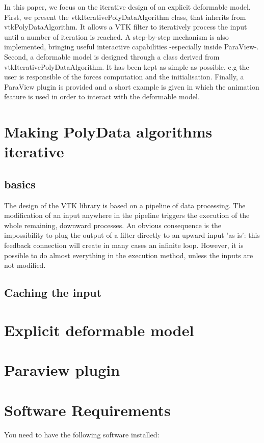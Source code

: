 \documentclass{InsightArticle}
\begin{document}
In this paper, we focus on the iterative design of an explicit deformable 
model. First, we present the vtkIterativePolyDataAlgorithm class, that 
inherits from vtkPolyDataAlgorithm. It allows a VTK filter to iteratively
process the input until a number of iteration is reached. A step-by-step
mechanism is also implemented, bringing useful interactive capabilities
-especially inside ParaView-. Second, a deformable model is designed through
a class derived from vtkIterativePolyDataAlgorithm. It has been kept as simple
as possible, e.g the user is responsible of the forces computation and the
initialisation. Finally, a ParaView plugin is provided and a short example 
is given in which the animation feature is used in order to interact with the 
deformable model.
%
\section{Making PolyData algorithms iterative}
\subsection{basics}
The design of the VTK library is based on a pipeline of data processing. The
modification of an input anywhere in the pipeline triggers the execution of the
whole remaining, downward processes. An obvious consequence is the 
impossibility to plug the output of a filter directly to an upward input 
'as is': this feedback connection will create in many cases an infinite loop.
However, it is possible to do almost everything in the execution method, unless
the inputs are not modified.
%
\subsection{Caching the input}
%
\section{Explicit deformable model}

\section{Paraview plugin}


\section{Software Requirements}

You need to have the following software installed:
\end{document}
